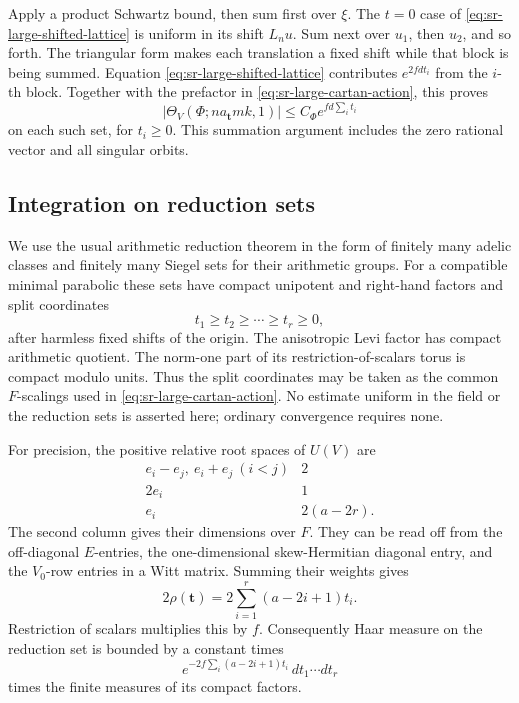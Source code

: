 Apply a product Schwartz bound, then sum first over
\(\xi\).
The \(t=0\) case of
\eqref{eq:sr-large-shifted-lattice} is uniform in its
shift \(L_nu\).
Sum next over \(u_1\), then \(u_2\), and so forth.
The triangular form makes each translation a fixed
shift while that block is being summed.
Equation \eqref{eq:sr-large-shifted-lattice} contributes
\(e^{2fd t_i}\) from the \(i\)-th block.
Together with the prefactor in
\eqref{eq:sr-large-cartan-action}, this proves
\begin{equation}\label{eq:sr-large-theta-bound}
             |\Theta_V(\Phi;n a_{\mathbf t}m k,1)|
                 \le C_\Phi e^{fd\sum_i t_i}
\end{equation}
on each such set, for \(t_i\ge0\).
This summation argument includes the zero rational
vector and all singular orbits.

\subsection{Integration on reduction sets}

We use the usual arithmetic reduction theorem in the
form of finitely many adelic classes and finitely many
Siegel sets for their arithmetic groups.
For a compatible minimal parabolic these sets have
compact unipotent and right-hand factors and split
coordinates
\[
                    t_1\ge t_2\ge\cdots\ge t_r\ge0 ,
\]
after harmless fixed shifts of the origin.
The anisotropic Levi factor has compact arithmetic
quotient.  The norm-one part of its restriction-of-scalars
torus is compact modulo units.
Thus the split coordinates may be taken as the common
\(F\)-scalings used in
\eqref{eq:sr-large-cartan-action}.
No estimate uniform in the field or the reduction
sets is asserted here; ordinary convergence requires
none.

For precision, the positive relative root spaces of
\(U(V)\) are
\[
 \begin{array}{c|c}
        e_i-e_j,\ e_i+e_j\ (i<j)&2\\
        2e_i&1\\
        e_i&2(a-2r).
 \end{array}
\]
The second column gives their dimensions over \(F\).
They can be read off from the off-diagonal
\(E\)-entries, the one-dimensional skew-Hermitian diagonal
entry, and the \(V_0\)-row entries in a Witt matrix.
Summing their weights gives
\[
                  2\rho(\mathbf t)
                      =2\sum_{i=1}^r(a-2i+1)t_i .
\]
Restriction of scalars multiplies this by \(f\).
Consequently Haar measure on the reduction set is
bounded by a constant times
\[
             e^{-2f\sum_i(a-2i+1)t_i}
                           \,dt_1\cdots dt_r
\]
times the finite measures of its compact factors.

